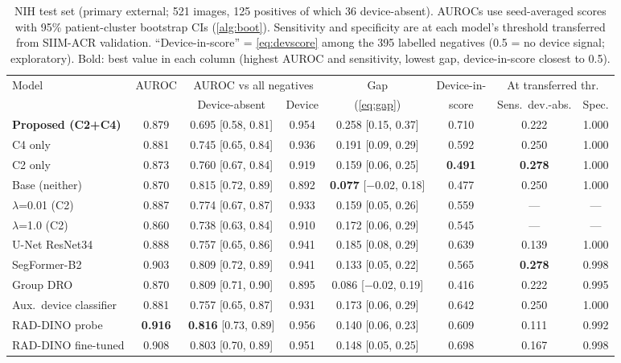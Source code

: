 \documentclass{ieeeaccess}
\newcommand{\ci}[2]{\scriptsize[#1, #2]}
\begin{document}
\begin{table}[!t]
\centering\small
\setlength{\tabcolsep}{3.5pt}
\caption{NIH test set (primary external; 521 images, 125 positives of which 36 device-absent). AUROCs use seed-averaged scores with 95\% patient-cluster bootstrap CIs (\cref{alg:boot}). Sensitivity and specificity are at each model's threshold transferred from SIIM-ACR validation. ``Device-in-score'' = \cref{eq:devscore} among the 395 labelled negatives (0.5 = no device signal; exploratory). Bold: best value in each column (highest AUROC and sensitivity, lowest gap, device-in-score closest to 0.5).}
\label{tab:nih}
\begin{tabular}{@{}l c c c c c c c@{}}
\toprule
Model & AUROC & \multicolumn{2}{c}{AUROC vs all negatives} & Gap & Device-in- & \multicolumn{2}{c}{At transferred thr.} \\
\cmidrule(lr){3-4}\cmidrule(l){7-8}
 & & Device-absent & Device & (\cref{eq:gap}) & score & Sens.\ dev.-abs. & Spec. \\
\midrule
\rowcolor{band}\textbf{Proposed (C2+C4)} & 0.879 & 0.695 \ci{0.58}{0.81} & 0.954 & 0.258 \ci{0.15}{0.37} & 0.710 & 0.222 & 1.000 \\
C4 only & 0.881 & 0.745 \ci{0.65}{0.84} & 0.936 & 0.191 \ci{0.09}{0.29} & 0.592 & 0.250 & 1.000 \\
C2 only & 0.873 & 0.760 \ci{0.67}{0.84} & 0.919 & 0.159 \ci{0.06}{0.25} & \textbf{0.491} & \textbf{0.278} & 1.000 \\
Base (neither) & 0.870 & 0.815 \ci{0.72}{0.89} & 0.892 & \textbf{0.077} \ci{$-$0.02}{0.18} & 0.477 & 0.250 & 1.000 \\
$\lambda$=0.01 (C2) & 0.887 & 0.774 \ci{0.67}{0.87} & 0.933 & 0.159 \ci{0.05}{0.26} & 0.559 & --- & --- \\
$\lambda$=1.0 (C2) & 0.860 & 0.738 \ci{0.63}{0.84} & 0.910 & 0.172 \ci{0.06}{0.29} & 0.545 & --- & --- \\
\midrule
U-Net ResNet34 & 0.888 & 0.757 \ci{0.65}{0.86} & 0.941 & 0.185 \ci{0.08}{0.29} & 0.639 & 0.139 & 1.000 \\
SegFormer-B2 & 0.903 & 0.809 \ci{0.72}{0.89} & 0.941 & 0.133 \ci{0.05}{0.22} & 0.565 & \textbf{0.278} & 0.998 \\
Group DRO & 0.870 & 0.809 \ci{0.71}{0.90} & 0.895 & 0.086 \ci{$-$0.02}{0.19} & 0.416 & 0.222 & 0.995 \\
Aux.\ device classifier & 0.881 & 0.757 \ci{0.65}{0.87} & 0.931 & 0.173 \ci{0.06}{0.29} & 0.642 & 0.250 & 1.000 \\
RAD-DINO probe & \textbf{0.916} & \textbf{0.816} \ci{0.73}{0.89} & 0.956 & 0.140 \ci{0.06}{0.23} & 0.609 & 0.111 & 0.992 \\
RAD-DINO fine-tuned & 0.908 & 0.803 \ci{0.70}{0.89} & 0.951 & 0.148 \ci{0.05}{0.25} & 0.698 & 0.167 & 0.998 \\
\bottomrule
\end{tabular}
\end{table}
\end{document}
